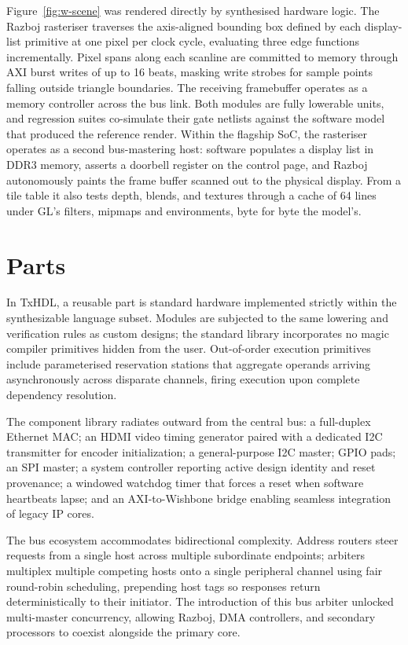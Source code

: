 \documentclass[journal,9pt]{IEEEtran}
\begin{document}
Figure~\ref{fig:w-scene} was rendered directly by synthesised hardware logic.
The Razboj rasteriser traverses the axis-aligned bounding box defined by each
display-list primitive at one pixel per clock cycle, evaluating three edge
functions incrementally. Pixel spans along each scanline are committed to
memory through AXI burst writes of up to 16 beats, masking write strobes for
sample points falling outside triangle boundaries. The receiving framebuffer
operates as a memory controller across the bus link. Both modules are fully
lowerable units, and regression suites co-simulate their gate netlists against
the software model that produced the reference render. Within the flagship SoC,
the rasteriser operates as a second bus-mastering host: software populates a
display list in DDR3 memory, asserts a doorbell register on the control page,
and Razboj autonomously paints the frame buffer scanned out to the physical
display. From a tile table it also tests depth, blends, and textures through a
cache of 64 lines under GL's filters, mipmaps and environments, byte for
byte the model's.

\section{Parts}

In TxHDL, a reusable part is standard hardware implemented strictly within the
synthesizable language subset. Modules are subjected to the same lowering and
verification rules as custom designs; the standard library incorporates no
magic compiler primitives hidden from the user. Out-of-order execution
primitives include parameterised reservation stations that aggregate operands
arriving asynchronously across disparate channels, firing execution upon
complete dependency resolution.

The component library radiates outward from the central bus: a full-duplex
Ethernet MAC; an HDMI video timing generator paired with a dedicated I2C
transmitter for encoder initialization; a general-purpose I2C master; GPIO
pads; an SPI master; a system controller reporting active design identity and
reset provenance; a windowed watchdog timer that forces a reset when software
heartbeats lapse; and an AXI-to-Wishbone bridge enabling seamless integration of
legacy IP cores.

The bus ecosystem accommodates bidirectional complexity. Address routers steer
requests from a single host across multiple subordinate endpoints; arbiters
multiplex multiple competing hosts onto a single peripheral channel using fair
round-robin scheduling, prepending host tags so responses return
deterministically to their initiator. The introduction of this bus arbiter
unlocked multi-master concurrency, allowing Razboj, DMA controllers, and
secondary processors to coexist alongside the primary core.
\end{document}
